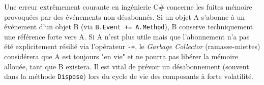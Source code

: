\vspace{0.5cm}

\begin{tcolorbox}[colback=red!5!white,colframe=red!75!black,title=Piège architectural : Les fuites mémoire (Memory Leaks)]
Une erreur extrêmement courante en ingénierie C\# concerne les fuites mémoire provoquées par des événements non désabonnés. Si un objet A s'abonne à un événement d'un objet B (via \texttt{B.Event += A.Method}), B conserve techniquement une référence forte vers A. Si A n'est plus utile mais que l'abonnement n'a pas été explicitement résilié via l'opérateur \texttt{-=}, le \textit{Garbage Collector} (ramasse-miettes) considérera que A est toujours "en vie" et ne pourra pas libérer la mémoire allouée, tant que B existera. Il est vital de prévoir un désabonnement (souvent dans la méthode \texttt{Dispose}) lors du cycle de vie des composants à forte volatilité.
\end{tcolorbox}

